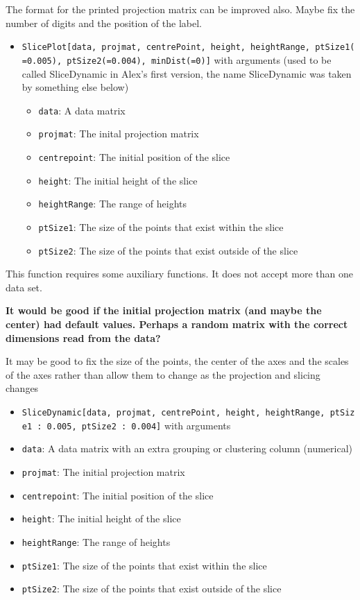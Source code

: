 \documentclass[]{interact}
\theoremstyle{plain}%
\theoremstyle{definition}
\theoremstyle{remark}
\providecommand{\tightlist}{%
  \setlength{\itemsep}{0pt}\setlength{\parskip}{0pt}}
\def\tightlist{}
\begin{document}
The format for the printed projection matrix can be improved also. Maybe
fix the number of digits and the position of the label.

\begin{itemize}
\item
  \texttt{SlicePlot{[}data,\ projmat,\ centrePoint,\ height,\ heightRange,\ ptSize1(=0.005),\ ptSize2(=0.004),\ minDist(=0){]}}
  with arguments (used to be called SliceDynamic in Alex's first
  version, the name SliceDynamic was taken by something else below)

  \begin{itemize}
  \tightlist
  \item
    \texttt{data}: A data matrix
  \item
    \texttt{projmat}: The inital projection matrix
  \item
    \texttt{centrepoint}: The initial position of the slice
  \item
    \texttt{height}: The initial height of the slice
  \item
    \texttt{heightRange}: The range of heights
  \item
    \texttt{ptSize1}: The size of the points that exist within the slice
  \item
    \texttt{ptSize2}: The size of the points that exist outside of the
    slice
  \end{itemize}
\end{itemize}

This function requires some auxiliary functions. It does not accept more
than one data set.

\textbf{It would be good if the initial projection matrix (and maybe the
center) had default values. Perhaps a random matrix with the correct
dimensions read from the data?}

It may be good to fix the size of the points, the center of the axes and
the scales of the axes rather than allow them to change as the
projection and slicing changes

\begin{itemize}
\item
  \texttt{SliceDynamic{[}data,\ projmat,\ centrePoint,\ height,\ heightRange,\ ptSize1\ :\ 0.005,\ ptSize2\ :\ 0.004{]}}
  with arguments
\item
  \texttt{data}: A data matrix with an extra grouping or clustering
  column (numerical)
\item
  \texttt{projmat}: The initial projection matrix
\item
  \texttt{centrepoint}: The initial position of the slice
\item
  \texttt{height}: The initial height of the slice
\item
  \texttt{heightRange}: The range of heights
\item
  \texttt{ptSize1}: The size of the points that exist within the slice
\item
  \texttt{ptSize2}: The size of the points that exist outside of the
  slice
\end{itemize}
\end{document}

